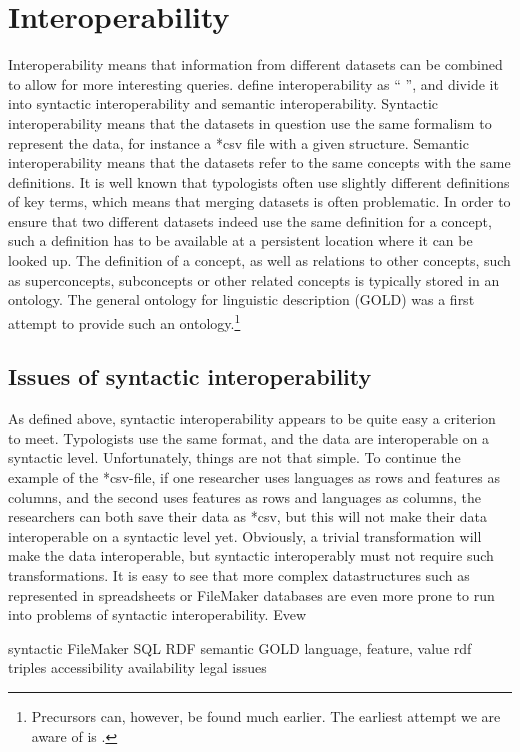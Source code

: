 \documentclass[a4paper,10pt]{article}
\begin{document}
\section{Interoperability}
Interoperability means that information from different datasets can be combined to allow for more  interesting queries. \citet{ide} define interoperability as `` '', and divide it into syntactic interoperability and semantic interoperability. Syntactic interoperability means that the datasets in question use the same formalism to represent the data, for instance a *csv file with a given structure. Semantic interoperability means that the datasets refer to the same concepts with the same definitions. It is well known that typologists often use slightly different definitions of key terms, which means that merging datasets is often problematic. In order to ensure that two different datasets indeed use the same definition for a concept, such a definition has to be available at a persistent location where it can be looked up. The definition of a concept, as well as relations to other concepts, such as superconcepts, subconcepts or other related concepts is typically stored in an ontology. The general ontology for linguistic description (GOLD) was a first attempt to provide such an ontology.\footnote{Precursors
 can, however, be found much earlier. The earliest attempt we are aware of is \citet{abc}.
} 

\subsection{Issues of syntactic interoperability}
As defined above, syntactic interoperability appears to be quite easy a criterion to meet. Typologists use the same format, and the data are interoperable on a syntactic level. Unfortunately, things are not that simple. To continue the example of the *csv-file, if one researcher uses languages as rows and features as columns, and the second uses features as rows and languages as columns, the researchers can both save their data as *csv, but this will not make their data interoperable on a syntactic level yet. Obviously, a trivial transformation will make the data interoperable, but syntactic interoperably must not require such transformations. It is easy to see that more complex datastructures such as represented in spreadsheets or FileMaker databases are even more prone to run into problems of syntactic interoperability. Evew

 
 syntactic
   FileMaker 
   SQL
   RDF
 semantic    
   GOLD 
   language, feature, value 
   rdf triples
 accessibility
  availability
  legal issues
   
\end{document}
